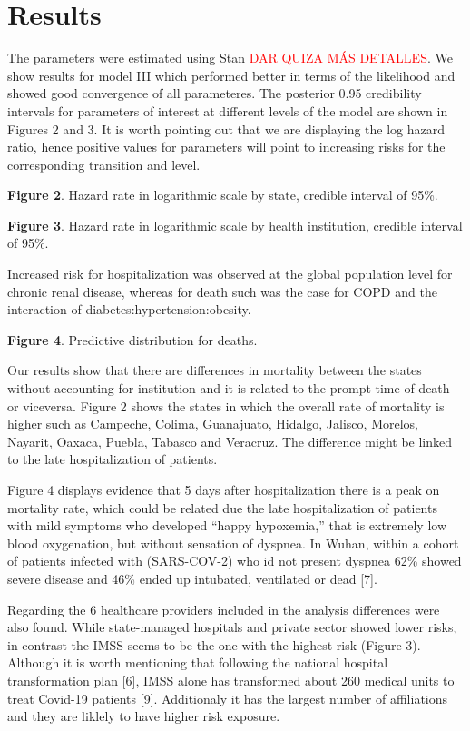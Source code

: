 \documentclass[10pt,letterpaper]{article}
\begin{document}
\hypertarget{results}{%
\section{Results}\label{results}}

The parameters were estimated using Stan \textcolor{red}{DAR QUIZA MÁS DETALLES}. We show
results for model III which performed better in terms of the
likelihood and showed good convergence of all parameteres. The posterior
0.95 credibility intervals for parameters of interest at different
levels of the model are shown in Figures 2 and 3. It is worth pointing
out that we are displaying the log hazard ratio, hence positive values
for parameters will point to increasing risks for the corresponding
transition and level.



\textbf{Figure 2}. Hazard rate in logarithmic scale by state, credible interval of 95\%.




\textbf{Figure 3}. Hazard rate in logarithmic scale by health institution, credible interval of 95\%.

Increased risk for hospitalization was observed at the global population
level for chronic renal disease, whereas for death such was the case for
COPD and the interaction of diabetes:hypertension:obesity.


\textbf{Figure 4}. Predictive distribution for deaths.


Our results show that there are differences in mortality between the
states without accounting for institution and it is
related to the prompt time of death or viceversa. Figure 2
shows the states in which the overall rate of mortality is higher such
as Campeche, Colima, Guanajuato, Hidalgo, Jalisco, Morelos, Nayarit,
Oaxaca, Puebla, Tabasco and Veracruz. The difference might be linked to
the late hospitalization of patients.


Figure 4 displays evidence that 5 days after hospitalization
there is a peak on mortality rate, which could be related due the late
hospitalization of patients with mild symptoms who developed ``happy
hypoxemia,'' that is extremely low blood oxygenation, but without
sensation of dyspnea. In Wuhan, within a cohort of patients infected with (SARS-COV-2) who id not present dyspnea 62\% showed
severe disease and 46\%  ended up intubated, ventilated or dead {[}7{]}.

Regarding the 6 healthcare providers  included in the analysis
differences were also found. While state-managed hospitals and private
sector showed lower risks, in contrast the IMSS seems to be the one with
the highest risk (Figure 3). Although it is worth mentioning that
following the national hospital transformation plan {[}6{]}, IMSS alone
has transformed about 260 medical units to treat Covid-19 patients
{[}9{]}. Additionaly it has the largest number of affiliations and they are  liklely to have higher risk exposure. 
\end{document}
